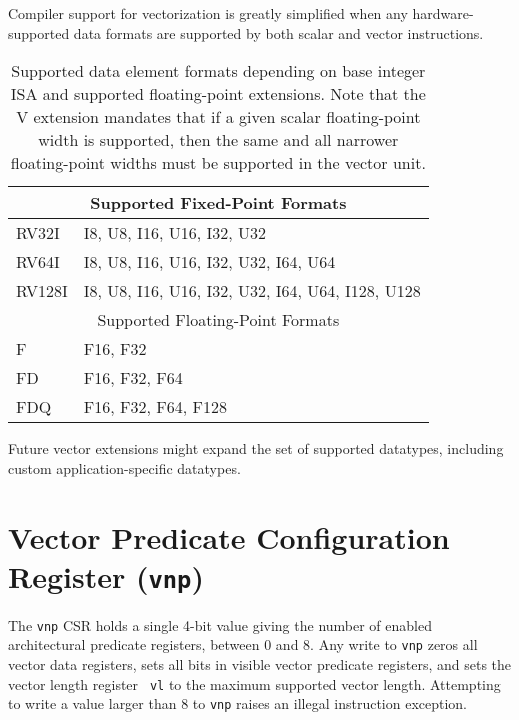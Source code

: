 \begin{commentary}
  Compiler support for vectorization is greatly simplified when any
  hardware-supported data formats are supported by both scalar and
  vector instructions.
\end{commentary}

\begin{table}[hbt]
  \centering
\begin{tabular}{|l|l|}
  \hline
  \multicolumn{2}{|c|}{Supported Fixed-Point Formats} \\
  \hline
  RV32I  & I8, U8, I16, U16, I32, U32 \\
  RV64I  & I8, U8, I16, U16, I32, U32, I64, U64 \\
  RV128I & I8, U8, I16, U16, I32, U32, I64, U64, I128, U128 \\
  \hline
  \hline
  \multicolumn{2}{|c|}{Supported Floating-Point Formats} \\
  \hline
  F      & F16, F32 \\
  FD     & F16, F32, F64 \\
  FDQ    & F16, F32, F64, F128 \\
  \hline
\end{tabular}
\caption{Supported data element formats depending on base integer ISA
  and supported floating-point extensions.  Note that the V extension
  mandates that if a given scalar floating-point width is supported,
  then the same and all narrower floating-point widths must be
  supported in the vector unit.}
\label{tab:velemtypes}
\end{table}

\begin{commentary}
  Future vector extensions might expand the set of supported
  datatypes, including custom application-specific datatypes.
\end{commentary}

\section{Vector Predicate Configuration Register ({\tt vnp})}

The {\tt vnp} CSR holds a single 4-bit value giving the number of
enabled architectural predicate registers, between 0 and 8.  Any write
to {\tt vnp} zeros all vector data registers, sets all bits in visible
vector predicate registers, and sets the vector length register {\tt
  vl} to the maximum supported vector length.  Attempting to write a
value larger than 8 to {\tt vnp} raises an illegal instruction
exception.

